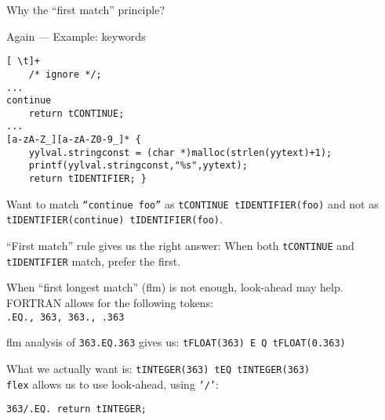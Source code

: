 \begin{slide*}
Why the ``first match'' principle?

Again --- Example: keywords\\[2ex]

{\scriptsize
\begin{verbatim}
[ \t]+
    /* ignore */;
...
continue
    return tCONTINUE;
...
[a-zA-Z_][a-zA-Z0-9_]* {
    yylval.stringconst = (char *)malloc(strlen(yytext)+1);
    printf(yylval.stringconst,"%s",yytext); 
    return tIDENTIFIER; } 
\end{verbatim}
}

Want to match {\tt ``continue foo''} as \mbox{{\tt tCONTINUE tIDENTIFIER(foo)}}
and not as \mbox{{\tt tIDENTIFIER(continue) tIDENTIFIER(foo)}}.

``First match'' rule gives us the right answer: When both {\tt tCONTINUE} and
{\tt tIDENTIFIER} match, prefer the first.

\vfil
\end{slide*}

\begin{slide*}
When ``first longest match'' (flm) is not enough, look-ahead may help.\\[2ex]

FORTRAN allows for the following tokens:\\
{\tt .EQ., 363, 363., .363}

flm analysis of {\tt 363.EQ.363} gives us:
\mbox{\tt tFLOAT(363) E Q tFLOAT(0.363)}

What we actually want is:
\mbox{\tt tINTEGER(363) tEQ tINTEGER(363)}\\[2ex]

{\tt flex} allows us to use look-ahead, using {\tt '/'}:

{\tt 363/.EQ.   return tINTEGER;}

\vfil
\end{slide*}

